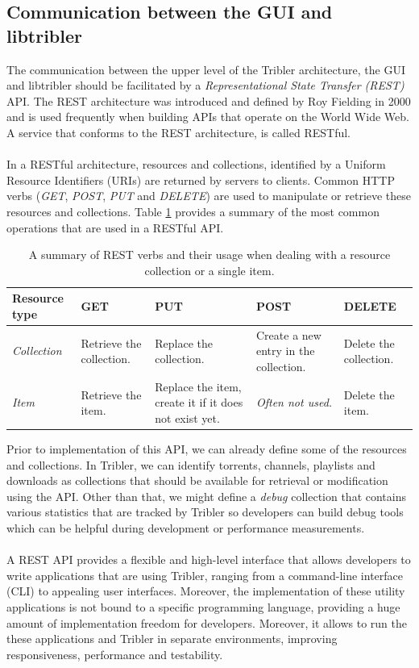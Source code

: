 \subsection{Communication between the GUI and libtribler}
\label{subsec:communication-gui-libtribler}
The communication between the upper level of the Tribler architecture, the GUI and libtribler should be facilitated by a \emph{Representational State Transfer (REST)} API. The REST architecture was introduced and defined by Roy Fielding in 2000\cite{fielding2000fielding} and is used frequently when building APIs that operate on the World Wide Web. A service that conforms to the REST architecture, is called RESTful.\\\\
In a RESTful architecture, resources and collections, identified by a Uniform Resource Identifiers (URIs) are returned by servers to clients. Common HTTP verbs (\emph{GET}, \emph{POST}, \emph{PUT} and \emph{DELETE}) are used to manipulate or retrieve these resources and collections. Table \ref{table:rest-api-operations} provides a summary of the most common operations that are used in a RESTful API.\\

\begin{table}[h!]
	\centering
	\begin{tabularx}{\textwidth}{|X|X|X|X|X|}
		\hline
		\textbf{Resource type} & \textbf{GET} & \textbf{PUT} & \textbf{POST} & \textbf{DELETE} \\ \hline
		\emph{Collection} & Retrieve the collection. & Replace the collection. & Create a new entry in the collection. & Delete the collection.\\ \hline
		\emph{Item} & Retrieve the item. & Replace the item, create it if it does not exist yet. & \emph{Often not used.} & Delete the item.\\ \hline
	\end{tabularx}
	\caption{A summary of REST verbs and their usage when dealing with a resource collection or a single item.}
	\label{table:rest-api-operations}
\end{table}

Prior to implementation of this API, we can already define some of the resources and collections. In Tribler, we can identify torrents, channels, playlists and downloads as collections that should be available for retrieval or modification using the API. Other than that, we might define a \emph{debug} collection that contains various statistics that are tracked by Tribler so developers can build debug tools which can be helpful during development or performance measurements.\\\\
A REST API provides a flexible and high-level interface that allows developers to write applications that are using Tribler, ranging from a command-line interface (CLI) to appealing user interfaces. Moreover, the implementation of these utility applications is not bound to a specific programming language, providing a huge amount of implementation freedom for developers. Moreover, it allows to run the these applications and Tribler in separate environments, improving responsiveness, performance and testability.

